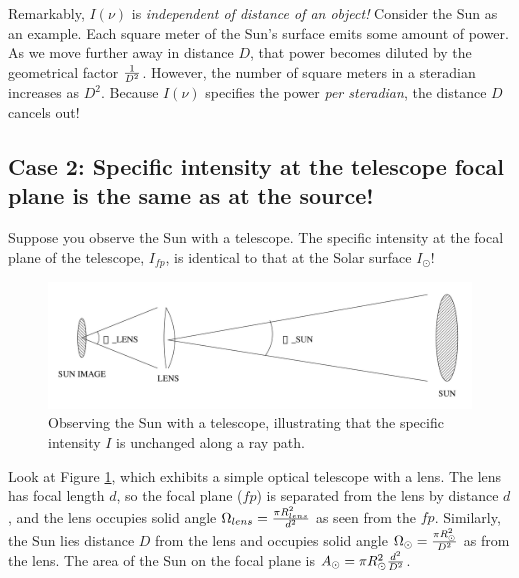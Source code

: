 \documentclass[12pt,psfig,preprint]{aastex}
\begin{document}
	Remarkably, $I(\nu)$ is {\it independent of distance of an
object!} Consider the Sun as an example.  Each square meter of the Sun's
surface emits some amount of power.  As we move further away in distance
$D$, that power becomes diluted by the geometrical factor $1 \over D^2$. 
However, the number of square meters in a steradian increases as $D^2$. 
Because $I(\nu)$ specifies the power {\it per steradian}, the distance
$D$ cancels out!

\subsection{ Case 2: Specific intensity at the telescope focal plane is the
same as at the source!}

Suppose you observe the Sun with a telescope. The specific intensity at
the focal plane of the telescope, $I_{fp}$, is identical to that at the
Solar surface $I_\odot$!

\begin{figure}[h!]
\begin{center}
\includegraphics[width=5in]{fount_fig1.png}
\end{center}
\vspace{-2ex}
\caption{\footnotesize Observing the Sun with a telescope, illustrating
  that the specific intensity $I$ is unchanged along a ray
  path.\label{fount1}}
\end{figure}

Look at Figure \ref{fount1}, which exhibits a simple optical
telescope  with a lens. The lens has focal length $d$, so the focal
plane ($fp$) is separated from the lens by distance $d$, and the lens
occupies  solid angle $\Omega_{lens} = {\pi R_{lens}^2 \over d^2}$ as
seen from the $fp$. Similarly, the Sun lies distance $D$ from the lens
and occupies solid angle $\Omega_\odot = {\pi R_\odot^2 \over D^2}$ as
from the lens. The area of the Sun on the focal plane is $A_\odot = \pi
R_\odot^2  {d^2 \over D^2} $.
\end{document}

